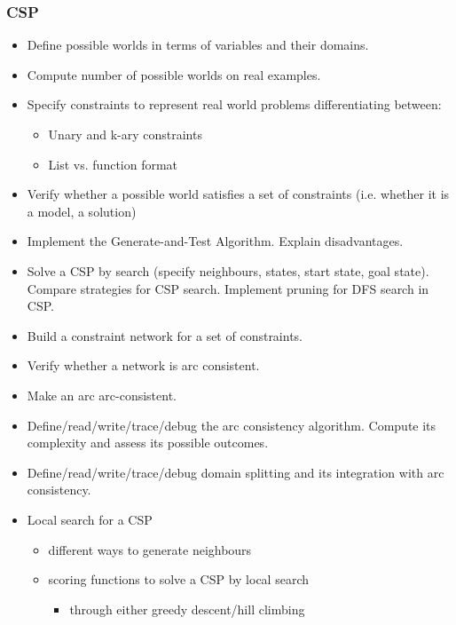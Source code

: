\documentclass{article}
\begin{document}
\subsubsection*{CSP}

\begin{itemize}
    \item Define possible worlds in terms of variables and their domains.
    \item Compute number of possible worlds on real examples.
    \item Specify constraints to represent real world problems differentiating between:
        \begin{itemize}
            \item Unary and k-ary constraints
            \item List vs. function format
        \end{itemize}
    \item Verify whether a possible world satisfies a set of constraints (i.e. whether it is a model, a solution)
    \item Implement the Generate-and-Test Algorithm. Explain disadvantages.
    \item Solve a CSP by search (specify neighbours, states, start state, goal state). Compare strategies for CSP search. Implement pruning for DFS search in CSP.
    \item Build a constraint network for a set of constraints.
    \item Verify whether a network is arc consistent.
    \item Make an arc arc-consistent.
    \item Define/read/write/trace/debug the arc consistency algorithm. Compute its complexity and assess its possible outcomes.
    \item Define/read/write/trace/debug domain splitting and its integration with arc consistency.
    \item Local search for a CSP
        \begin{itemize}
            \item different ways to generate neighbours
            \item scoring functions to solve a CSP by local search
                \begin{itemize}
                    \item through either greedy descent/hill climbing
                \end{itemize}
        \end{itemize}

\end{itemize}
\end{document}
